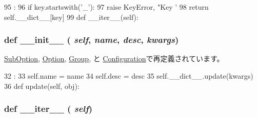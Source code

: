 \begin{DoxyCode}
95                               :
96         if key.startswith('_'):
97             raise KeyError, "Key '%
98         return self.__dict__[key]
99 
    def __iter__(self):
\end{DoxyCode}
\hypertarget{classm5_1_1util_1_1jobfile_1_1Data_ac775ee34451fdfa742b318538164070e}{
\subsubsection[{\_\-\_\-init\_\-\_\-}]{\setlength{\rightskip}{0pt plus 5cm}def \_\-\_\-init\_\-\_\- ( {\em self}, \/   {\em name}, \/   {\em desc}, \/   {\em kwargs})}}
\label{classm5_1_1util_1_1jobfile_1_1Data_ac775ee34451fdfa742b318538164070e}


\hyperlink{classm5_1_1util_1_1jobfile_1_1SubOption_ac775ee34451fdfa742b318538164070e}{SubOption}, \hyperlink{classm5_1_1util_1_1jobfile_1_1Option_ac775ee34451fdfa742b318538164070e}{Option}, \hyperlink{classm5_1_1util_1_1jobfile_1_1Group_ac775ee34451fdfa742b318538164070e}{Group}, と \hyperlink{classm5_1_1util_1_1jobfile_1_1Configuration_ac775ee34451fdfa742b318538164070e}{Configuration}で再定義されています。


\begin{DoxyCode}
32                                             :
33         self.name = name
34         self.desc = desc
35         self.__dict__.update(kwargs)
36 
    def update(self, obj):
\end{DoxyCode}
\hypertarget{classm5_1_1util_1_1jobfile_1_1Data_a3009f152864dea4eb5e89cd94143d563}{
\subsubsection[{\_\-\_\-iter\_\-\_\-}]{\setlength{\rightskip}{0pt plus 5cm}def \_\-\_\-iter\_\-\_\- ( {\em self})}}
\label{classm5_1_1util_1_1jobfile_1_1Data_a3009f152864dea4eb5e89cd94143d563}



